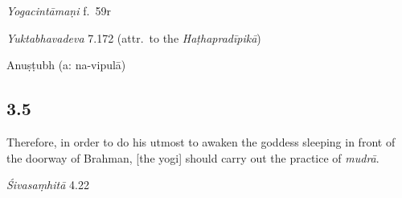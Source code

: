 \begin{ekdosis}
\begin{testimonia}[hp03_004]
\emph{Yogacintāmaṇi} f.~59r
\begin{versinnote}
\end{versinnote}

\emph{Yuktabhavadeva} 7.172 (attr.~to the \emph{Haṭhapradīpikā})
\begin{versinnote}
\end{versinnote}
\end{testimonia}


\begin{metre}[hp03_004]
Anuṣṭubh (a: na-vipulā)
\end{metre}

\subsection*{3.5}
\begin{translation}[hp03_005]
Therefore, in order to do his utmost to awaken the goddess sleeping in front of the doorway of Brahman, [the yogi] should carry out the practice of \emph{mudrā}.
\end{translation}

\begin{sources}[hp03_005]
\emph{Śivasaṃhitā} 4.22
\begin{versinnote}
\end{versinnote}
\end{sources}


\end{ekdosis}
